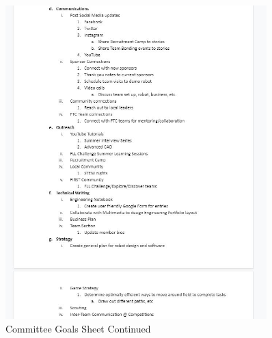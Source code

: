 \begin{figure}[htp]
\centering
\includegraphics[width=0.9\textwidth, angle=0]{Meetings/August/08-10-21/8-10-21_Image4 - Nathan Forrer.JPG}
\caption{Committee Goals Sheet Continued}
\label{fig:pic4}
\end{figure}